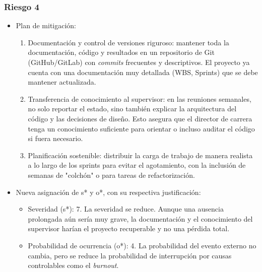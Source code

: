 \documentclass[
11pt, %
]{charter}
\begin{document}
\subsubsection*{Riesgo 4}
\begin{itemize}
    \item Plan de mitigación:
    \begin{enumerate}
        \item Documentación y control de versiones riguroso: mantener toda la documentación, código y resultados en un repositorio de Git (GitHub/GitLab) con \textit{commits} frecuentes y descriptivos. El proyecto ya cuenta con una documentación muy detallada (WBS, Sprints) que se debe mantener actualizada.
        \item Transferencia de conocimiento al supervisor: en las reuniones semanales, no solo reportar el estado, sino también explicar la arquitectura del código y las decisiones de diseño. Esto asegura que el director de carrera tenga un conocimiento suficiente para orientar o incluso auditar el código si fuera necesario.
        \item Planificación sostenible: distribuir la carga de trabajo de manera realista a lo largo de los sprints para evitar el agotamiento, con la inclusión de semanas de "colchón" o para tareas de refactorización.
    \end{enumerate}
    \item Nueva asignación de s* y o*, con su respectiva justificación:
    \begin{itemize}
        \item Severidad (s*): 7. La severidad se reduce. Aunque una ausencia prolongada aún sería muy grave, la documentación y el conocimiento del supervisor harían el proyecto recuperable y no una pérdida total.
        \item Probabilidad de ocurrencia (o*): 4. La probabilidad del evento externo no cambia, pero se reduce la probabilidad de interrupción por causas controlables como el \textit{burnout}.
    \end{itemize}
\end{itemize}
\end{document}
